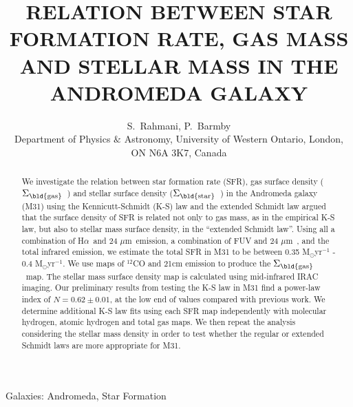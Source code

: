 \documentclass[useAMS,usenatbib]{mn2e}
\newcommand \sigmagas    {$\Sigma_{\rm \bld {gas }}$\ }
\newcommand \sigmastar    {$\Sigma_{\rm \bld {star }}$\ }
\newcommand \halpha    {H$\alpha $\ }
\newcommand \um    {$\mu$m\ }
\begin{document}
\title[WHICH STAR FORMATION LAW IN M31]{RELATION BETWEEN STAR FORMATION RATE, GAS MASS AND STELLAR MASS IN THE ANDROMEDA GALAXY}
\author[S. Rahmani $\&$ P. Barmby]{S.~Rahmani, P.~Barmby\\
Department of Physics $\&$ Astronomy, University of Western Ontario, London, ON N6A 3K7, Canada}
\maketitle

\begin{abstract} %
 We investigate the relation between star formation rate (SFR), gas surface density (\sigmagas) and stellar surface density (\sigmastar) in the Andromeda galaxy (M31) using the Kennicutt-Schmidt (K-S) law and the extended Schmidt law \cite{Shi11} argued that the surface density of SFR is related not only to gas mass, as in the empirical K-S law,  but also to stellar mass surface density, in the ``extended Schmidt law''. Using all a combination of \halpha and 24 \um emission, a combination of FUV and 24 \um, and the total infrared emission, we estimate the total SFR in M31 to be between 0.35 M$_{\odot}$yr$^{-1}$ - 0.4 M$_{\odot}$yr$^{-1}$. We use maps of $^{12}$CO and 21cm emission to produce the \sigmagas map.%
 The stellar mass surface density  map is calculated using mid-infrared IRAC imaging. Our preliminary results from testing the K-S law in M31 find a power-law index of  $N = 0.62 \pm 0.01$, at the low end of values compared with previous work. We determine additional K-S law fits using each SFR map independently with molecular hydrogen, atomic hydrogen and total gas maps. We then repeat the analysis considering the stellar mass density in order to test whether the regular or extended Schmidt laws are more appropriate for M31.

\end{abstract}
\begin{keywords}
Galaxies: Andromeda, Star Formation
\end{keywords}
\end{document}

